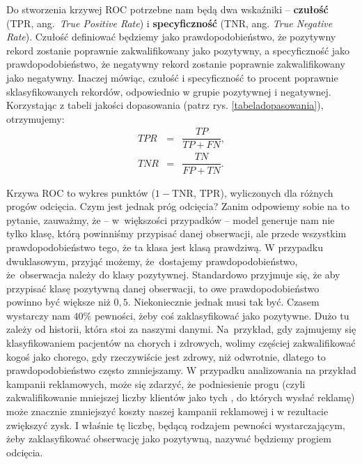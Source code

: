 \documentclass{mini}
\begin{document}
Do stworzenia krzywej ROC potrzebne nam będą dwa wskaźniki -- \textbf{czułość} (TPR, ang.~\textit{True Positive Rate}) i \textbf{specyficzność} (TNR, ang. \textit{True Negative Rate}). Czułość definiować będziemy jako prawdopodobieństwo, że pozytywny rekord zostanie poprawnie zakwalifikowany jako pozytywny, a specyficzność jako prawdopodobieństwo, że negatywny rekord zostanie poprawnie zakwalifikowany jako negatywny. Inaczej mówiąc, czułość i specyficzność to procent poprawnie sklasyfikowanych rekordów, odpowiednio w grupie pozytywnej i negatywnej. Korzystając z tabeli jakości dopasowania (patrz rys. \ref{tabeladopasowania}), otrzymujemy:
\begin{eqnarray*}
	TPR&=&\dfrac{TP}{TP+FN},\\
	TNR&=&\dfrac{TN}{FP+TN}.		
\end{eqnarray*}  

Krzywa ROC to wykres punktów ($1-$TNR, TPR), wyliczonych dla różnych progów odcięcia. Czym jest jednak próg odcięcia? Zanim odpowiemy sobie na to pytanie, zauważmy, że -- w~większości przypadków -- model generuje nam nie tylko klasę, którą powinniśmy przypisać danej obserwacji, ale przede wszystkim prawdopodobieństwo tego, że ta klasa jest klasą prawdziwą. W przypadku dwuklasowym, przyjąć możemy, że~dostajemy prawdopodobieństwo, że~obserwacja należy do klasy pozytywnej. Standardowo przyjmuje się, że aby przypisać klasę pozytywną danej obserwacji, to owe prawdopodobieństwo powinno być większe niż $0,5$. Niekoniecznie jednak musi tak być. Czasem wystarczy nam $40\%$ pewności, żeby coś zaklasyfikować jako pozytywne. Dużo tu zależy od historii, która stoi za naszymi danymi. Na~przykład, gdy zajmujemy się klasyfikowaniem pacjentów na chorych i zdrowych, wolimy częściej zakwalifikować kogoś jako chorego, gdy rzeczywiście jest zdrowy, niż odwrotnie, dlatego to prawdopodobieństwo często zmniejszamy. W przypadku analizowania na przykład kampanii reklamowych, może się zdarzyć, że podniesienie progu (czyli zakwalifikowanie mniejszej liczby klientów jako tych , do których wysłać reklamę) może znacznie zmniejszyć koszty naszej kampanii reklamowej i w rezultacie zwiększyć zysk. I właśnie tę liczbę, będącą rodzajem pewności wystarczającym, żeby zaklasyfikować obserwację jako pozytywną, nazywać będziemy progiem odcięcia. 
\end{document}
